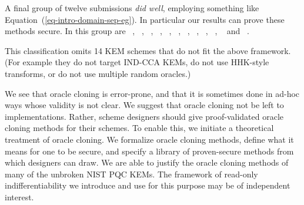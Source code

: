 A final group of twelve submissions \textit{did well}, employing something like Equation~(\ref{eq-intro-domain-sep-eg}). In particular our results can prove these methods secure.
In this group are
~\cite{nistpqc:ClassicMcEliece},
~\cite{nistpqc:CRYSTALSKyber},
~\cite{nistpqc:EMBLEM},
~\cite{nistpqc:FrodoKEM},
~\cite{nistpqc:HQC},
~\cite{nistpqc:LIMA},
~\cite{nistpqc:NTRU-HRSS-KEM},
~\cite{nistpqc:NTRUPrime},
~\cite{nistpqc:NTS-KEM},
~\cite{nistpqc:RQC},
~\cite{nistpqc:SIKE} and
~\cite{nistpqc:ThreeBears}.




This classification omits 14 KEM schemes that do not fit the above framework.
(For example they do not target IND-CCA KEMs, do not use HHK-style transforms, or do not use multiple random oracles.)




%


 We see that oracle cloning is error-prone, and that it is sometimes done in ad-hoc ways whose validity is not clear. We suggest that oracle cloning not be left to implementations. Rather, scheme designers should give proof-validated oracle cloning methods for their schemes. To enable this, we initiate a theoretical treatment of oracle cloning. We formalize oracle cloning methods, define what it means for one to be secure, and specify a library of proven-secure methods from which designers can draw. We are able to justify the oracle cloning methods of many of the unbroken NIST PQC KEMs.  The framework of read-only indifferentiability we introduce and use for this purpose may be of independent interest.



